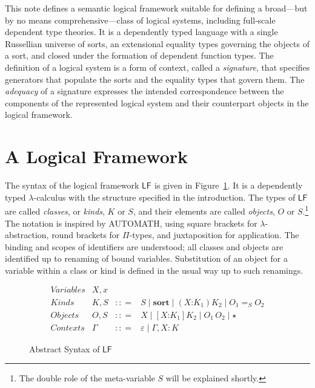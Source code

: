 \documentclass[11pt,twoside]{article}
\newcommand{\LF}[1][]{\ensuremath{\mathsf{LF}_{#1}}}
\newcommand{\bnfdef}{\mathrel{{:}{:}{=}}}
\newcommand{\bnfalt}{\mathrel{\mid}}
\newcommand{\sortclass}{\ensuremath{\textbf{sort}}}
\newcommand{\eqclass}[3]{{#2}=_{#1}{#3}}
\newcommand{\piclass}[3]{({#2}\mathord{:}{#1}){#3}}
\newcommand{\lamobj}[3]{[{#2}\mathord{:}{#1}]{#3}}
\newcommand{\appobj}[2]{{#1}\,{#2}}
\newcommand{\reflobj}{\star}
\newcommand{\empctx}{\varepsilon}
\newcommand{\snocctx}[3]{{#1},{#2}{:}{#3}}
\begin{document}
This note defines a semantic logical framework suitable for defining a broad---but by no
means comprehensive---class of logical systems, including full-scale dependent type
theories.  It is a dependently typed language with a single Russellian universe of sorts,
an extensional equality types governing the objects of a sort, and closed under the
formation of dependent function types.  The definition of a logical system is a form of
context, called a \emph{signature}, that specifies generators that populate the sorts and
the equality types that govern them.  The \emph{adequacy} of a signature expresses the
intended correspondence between the components of the represented logical system and their
counterpart objects in the logical framework.

\section{A Logical Framework}

The syntax of the logical framework \LF{} is given in Figure~\ref{fig:lf-syntax}.  It is a
dependently typed $\lambda$-calculus with the structure specified in the introduction.  The
types of \LF{} are called \emph{classes}, or \emph{kinds}, $K$ or $S$, and their elements
are called \emph{objects}, $O$ or $S$.\footnote{The double role of the meta-variable $S$
  will be explained shortly.}  The notation is inspired by \textsf{AUTOMATH}, using square
brackets for $\lambda$-abstraction, round brackets for $\Pi$-types, and juxtaposition for
application.  The binding and scopes of identifiers are understood; all classes and
objects are identified up to renaming of bound variables.  Substitution of an object for a
variable within a class or kind is defined in the usual way up to such renamings.

\begin{figure}[tp]
  
  \begin{displaymath}
    \begin{array}{lrcl}
      \textit{Variables} & X,x \\
      \textit{Kinds} & K, S & \bnfdef{} & S \bnfalt \sortclass \bnfalt \piclass{K_{1}}{X}{K_{2}}
                                          \bnfalt \eqclass{S}{O_{1}}{O_{2}} \\
      \textit{Objects} & O, S & \bnfdef & X \bnfalt \lamobj{K_{1}}{X}{K_{2}} \bnfalt
                                          \appobj{O_{1}}{O_{2}} \bnfalt \reflobj{} \\
      \textit{Contexts} & \Gamma & \bnfdef & \empctx{} \bnfalt \snocctx{\Gamma}{X}{K}
    \end{array}
  \end{displaymath}

  \caption{Abstract Syntax of \LF{}}
  \label{fig:lf-syntax}
\end{figure}
\end{document}
